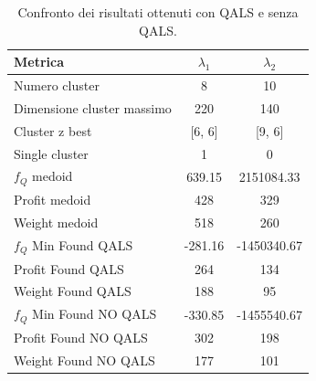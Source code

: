 \documentclass[a4paper,12pt]{article}
\begin{document}
\begin{table}[h]
\centering
\begin{tabular}{lcc}
\hline
\textbf{Metrica} & \(\lambda_1\) & \(\lambda_2\) \\
\hline
Numero cluster & 8 & 10 \\
Dimensione cluster massimo & 220 & 140 \\
Cluster z best & [6, 6] & [9, 6] \\
Single cluster & 1 & 0 \\
\(f_Q\) medoid & 639.15 & 2151084.33 \\
Profit medoid & 428 & 329 \\
Weight medoid & 518 & 260 \\
\hline
\(f_Q\) Min Found QALS & -281.16 & -1450340.67 \\
Profit Found QALS & 264 & 134 \\
Weight Found QALS & 188 & 95 \\
\hline
\(f_Q\) Min Found NO QALS & -330.85 & -1455540.67 \\
Profit Found NO QALS & 302 & 198 \\
Weight Found NO QALS & 177 & 101 \\
\hline
\end{tabular}

\caption{Confronto dei risultati ottenuti con QALS e senza QALS.}
\label{tab:confronto-qals-noqals}
\end{table}
\end{document}
